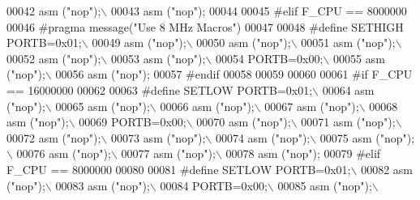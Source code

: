 \begin{DoxyCode}
00042 \textcolor{preprocessor}{               asm ("nop");\(\backslash\)}
00043 \textcolor{preprocessor}{               asm ("nop");}
00044                
00045 \textcolor{preprocessor}{#elif F\_CPU == 8000000}
00046 \textcolor{preprocessor}{#pragma message("Use 8 MHz Macros")}
00047 
00048 \textcolor{preprocessor}{#define SETHIGH PORTB=0x01;\(\backslash\)}
00049 \textcolor{preprocessor}{               asm ("nop");\(\backslash\)}
00050 \textcolor{preprocessor}{               asm ("nop");\(\backslash\)}
00051 \textcolor{preprocessor}{               asm ("nop");\(\backslash\)}
00052 \textcolor{preprocessor}{               asm ("nop");\(\backslash\)}
00053 \textcolor{preprocessor}{               asm ("nop");\(\backslash\)}
00054 \textcolor{preprocessor}{               PORTB=0x00;\(\backslash\)}
00055 \textcolor{preprocessor}{               asm ("nop");\(\backslash\)}
00056 \textcolor{preprocessor}{               asm ("nop");}
00057 \textcolor{preprocessor}{#endif}
00058 
00059 
00060 
00061 \textcolor{preprocessor}{#if F\_CPU == 16000000}
00062 
00063 \textcolor{preprocessor}{#define SETLOW PORTB=0x01;\(\backslash\)}
00064 \textcolor{preprocessor}{              asm ("nop");\(\backslash\)}
00065 \textcolor{preprocessor}{              asm ("nop");\(\backslash\)}
00066 \textcolor{preprocessor}{              asm ("nop");\(\backslash\)}
00067 \textcolor{preprocessor}{              asm ("nop");\(\backslash\)}
00068 \textcolor{preprocessor}{              asm ("nop");\(\backslash\)}
00069 \textcolor{preprocessor}{              PORTB=0x00;\(\backslash\)}
00070 \textcolor{preprocessor}{              asm ("nop");\(\backslash\)}
00071 \textcolor{preprocessor}{              asm ("nop");\(\backslash\)}
00072 \textcolor{preprocessor}{              asm ("nop");\(\backslash\)}
00073 \textcolor{preprocessor}{              asm ("nop");\(\backslash\)}
00074 \textcolor{preprocessor}{              asm ("nop");\(\backslash\)}
00075 \textcolor{preprocessor}{              asm ("nop");\(\backslash\)}
00076 \textcolor{preprocessor}{              asm ("nop");\(\backslash\)}
00077 \textcolor{preprocessor}{              asm ("nop");\(\backslash\)}
00078 \textcolor{preprocessor}{              asm ("nop");}
00079 \textcolor{preprocessor}{#elif F\_CPU == 8000000}
00080 
00081 \textcolor{preprocessor}{#define SETLOW PORTB=0x01;\(\backslash\)}
00082 \textcolor{preprocessor}{               asm ("nop");\(\backslash\)}
00083 \textcolor{preprocessor}{               asm ("nop");\(\backslash\)}
00084 \textcolor{preprocessor}{               PORTB=0x00;\(\backslash\)}
00085 \textcolor{preprocessor}{               asm ("nop");\(\backslash\)}

\end{DoxyCode}
